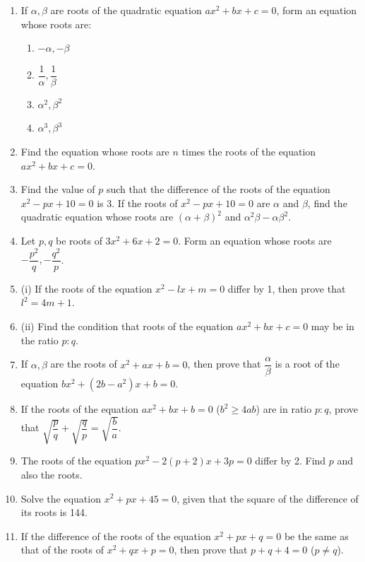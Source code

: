 \documentclass[12pt,a4paper]{article}
\begin{document}
\begin{enumerate}
		\item If $\alpha, \beta$ are roots of the quadratic equation $ax^2 + bx + c = 0$, form an equation whose roots are:
		\begin{enumerate}[label=(\roman*)]
			\item $-\alpha, -\beta$
			\item $\dfrac{1}{\alpha}, \dfrac{1}{\beta}$
			\item $\alpha^2, \beta^2$
			\item $\alpha^3, \beta^3$
		\end{enumerate}
		
		\item Find the equation whose roots are $n$ times the roots of the equation $ax^2 + bx + c = 0$.
		
		\item Find the value of $p$ such that the difference of the roots of the equation $x^2 - px + 10 = 0$ is 3. If the roots of $x^2 - px + 10 = 0$ are $\alpha$ and $\beta$, find the quadratic equation whose roots are $(\alpha + \beta)^2$ and $\alpha^2\beta - \alpha\beta^2$.
		
		\item Let $p, q$ be roots of $3x^2 + 6x + 2 = 0$. Form an equation whose roots are $-\dfrac{p^2}{q}, -\dfrac{q^2}{p}$.
		
		\item (i) If the roots of the equation $x^2 - lx + m = 0$ differ by 1, then prove that $l^2 = 4m + 1$.
		\item (ii) Find the condition that roots of the equation $ax^2 + bx + c = 0$ may be in the ratio $p : q$.
		
		\item If $\alpha, \beta$ are the roots of $x^2 + ax + b = 0$, then prove that $\dfrac{\alpha}{\beta}$ is a root of the equation $bx^2 + (2b - a^2)x + b = 0$.
		
		\item If the roots of the equation $ax^2 + bx + b = 0$ ($b^2 \geq 4ab$) are in ratio $p : q$, prove that $\sqrt{\dfrac{p}{q}} + \sqrt{\dfrac{q}{p}} = \sqrt{\dfrac{b}{a}}$.
		
		\item The roots of the equation $px^2 - 2(p+2)x + 3p = 0$ differ by 2. Find $p$ and also the roots.
		
		\item Solve the equation $x^2 + px + 45 = 0$, given that the square of the difference of its roots is 144.
		
		\item If the difference of the roots of the equation $x^2 + px + q = 0$ be the same as that of the roots of $x^2 + qx + p = 0$, then prove that $p + q + 4 = 0$ ($p \neq q$).
		

\end{enumerate}
\end{document}
